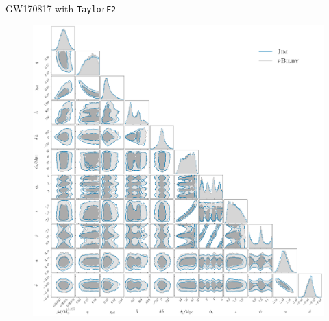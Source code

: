 \documentclass[usenames,dvipsnames,t]{beamer}
\begin{document}
\begin{frame}{GW170817 with \texttt{TaylorF2}}
  \vspace{-4.5mm}
  \begin{figure}

    \begin{minipage}[c]{0.2\textwidth}
    \caption{}\label{fig: GW170817 TaylorF2}
    \end{minipage}\hfill
    \begin{minipage}[c]{0.8\textwidth}
    \includegraphics[scale = 0.132]{Figures/GW170817_TaylorF2.pdf}
    \end{minipage}
    
  \end{figure}
\end{frame}
\end{document}
